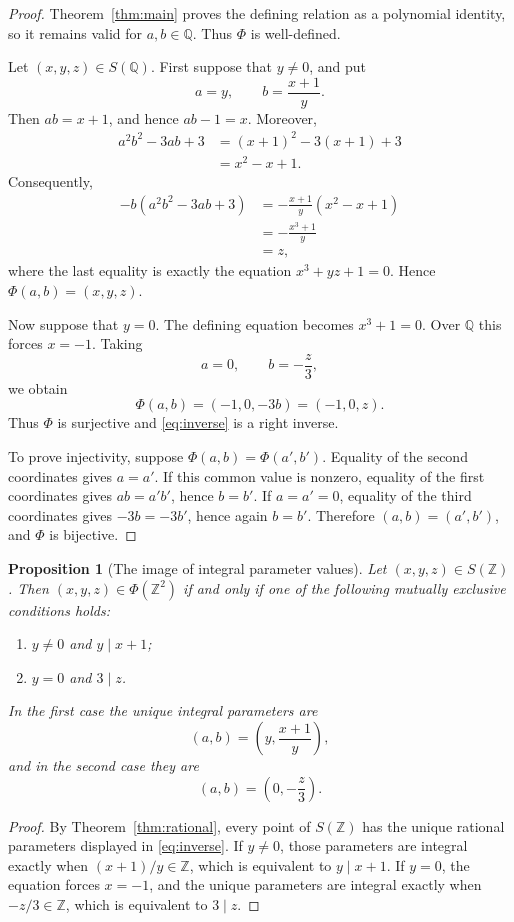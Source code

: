 \documentclass[11pt]{article}
\newtheorem{proposition}[theorem]{Proposition}
\theoremstyle{remark}
\newcommand{\Z}{\mathbb{Z}}
\newcommand{\Q}{\mathbb{Q}}
\begin{document}
\begin{proof}
Theorem~\ref{thm:main} proves the defining relation as a polynomial
identity, so it remains valid for $a,b\in\Q$.  Thus $\Phi$ is
well-defined.

Let $(x,y,z)\in S(\Q)$.  First suppose that $y\ne0$, and put
\[
 a=y,
 \qquad
 b=\frac{x+1}{y}.
\]
Then $ab=x+1$, and hence $ab-1=x$.  Moreover,
\begin{align*}
 a^2b^2-3ab+3
 &=(x+1)^2-3(x+1)+3\\
 &=x^2-x+1.
\end{align*}
Consequently,
\begin{align*}
 -b(a^2b^2-3ab+3)
 &=-\frac{x+1}{y}(x^2-x+1)\\
 &=-\frac{x^3+1}{y}\\
 &=z,
\end{align*}
where the last equality is exactly the equation
$x^3+yz+1=0$.  Hence $\Phi(a,b)=(x,y,z)$.

Now suppose that $y=0$.  The defining equation becomes $x^3+1=0$.
Over $\Q$ this forces $x=-1$.  Taking
\[
 a=0,
 \qquad
 b=-\frac{z}{3},
\]
we obtain
\[
 \Phi(a,b)=(-1,0,-3b)=(-1,0,z).
\]
Thus $\Phi$ is surjective and \eqref{eq:inverse} is a right inverse.

To prove injectivity, suppose $\Phi(a,b)=\Phi(a',b')$.  Equality of the
second coordinates gives $a=a'$.  If this common value is nonzero,
equality of the first coordinates gives $ab=a'b'$, hence $b=b'$.
If $a=a'=0$, equality of the third coordinates gives
$-3b=-3b'$, hence again $b=b'$.  Therefore $(a,b)=(a',b')$, and
$\Phi$ is bijective.
\end{proof}

\begin{proposition}[The image of integral parameter values]\label{prop:integralimage}
Let $(x,y,z)\in S(\Z)$.  Then $(x,y,z)\in\Phi(\Z^2)$ if and only if
one of the following mutually exclusive conditions holds:
\begin{enumerate}
 \item $y\ne0$ and $y\mid x+1$;
 \item $y=0$ and $3\mid z$.
\end{enumerate}
In the first case the unique integral parameters are
\[
 (a,b)=\left(y,\frac{x+1}{y}\right),
\]
and in the second case they are
\[
 (a,b)=\left(0,-\frac{z}{3}\right).
\]
\end{proposition}

\begin{proof}
By Theorem~\ref{thm:rational}, every point of $S(\Z)$ has the unique
rational parameters displayed in \eqref{eq:inverse}.  If $y\ne0$,
those parameters are integral exactly when
$(x+1)/y\in\Z$, which is equivalent to $y\mid x+1$.  If $y=0$, the
equation forces $x=-1$, and the unique parameters are integral exactly
when $-z/3\in\Z$, which is equivalent to $3\mid z$.
\end{proof}
\end{document}
